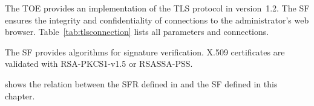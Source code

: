 

The TOE provides an implementation of the TLS protocol in version~1.2. The SF
ensures the integrity and confidentiality of connections to the administrator's
web browser. Table~\vref{tab:tlsconnection} lists all parameters and connections.


The SF  provides algorithms for signature
verification. X.509 certificates are validated with RSA-PKCS1-v1.5 or
RSASSA-PSS.



\pagebreak


 shows the relation between the SFR defined in
 and the SF defined in this chapter.




